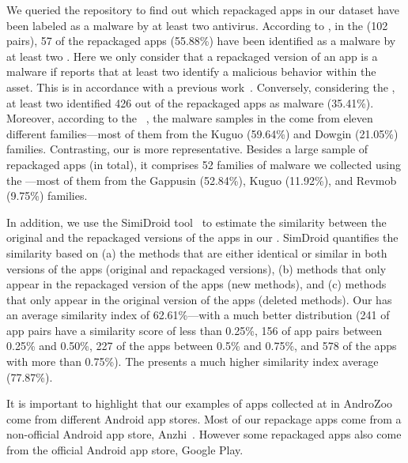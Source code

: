 We queried the \vt repository to find out which repackaged apps in our
dataset have been labeled as a malware by at least two antivirus. According to \vt, in the \sds (102 pairs),
57 of the repackaged apps (55.88\%) have been identified as a malware by at least two
\ses. Here we only consider that a repackaged version of an app is a malware if \vt reports that at least
two \ses identify a malicious behavior within the asset. This is in accordance with a previous work~\cite{vt-label}. Conversely, considering the \cds, at least two \se identified 426 out of the \apps repackaged apps as malware (35.41\%).
Moreover, according to the
\avt~\cite{avclass2-paper}, the malware samples in the \sds come from eleven different families---most of them from the Kuguo (59.64\%) and Dowgin (21.05\%) families.
Contrasting, our \cds is more representative. Besides a large sample of repackaged apps (\apps in total), it
comprises 52 families of malware we collected using the \avt ---most
of them from the Gappusin (52.84\%), Kuguo (11.92\%), and Revmob (9.75\%) families.

In addition, we use the SimiDroid tool~\cite{DBLP:conf/trustcom/0029BK17} to
estimate the similarity between the original and the repackaged versions of the
apps in our \cds. SimDroid quantifies the similarity
based on (a) the methods that are either identical or similar in both versions of the apps (original and repackaged versions),
(b) methods that only appear in the repackaged version of the apps (new methods), and (c) methods that only appear in the
original version of the apps (deleted methods).
Our \cds has an average similarity index of 62.61\%---with a much better distribution (241 of
app pairs have a similarity score of less than 0.25\%, 156 of app pairs
between 0.25\% and 0.50\%, 227 of the apps between 0.5\% and 0.75\%,
and 578 of the apps with more than 0.75\%). The \sds presents a much higher
similarity index average (77.87\%). 

It is important to highlight that our examples of apps collected at in AndroZoo come from different Android app stores. Most of our repackage apps come from a non-official Android app store, Anzhi~\cite{anzhi}. However some repackaged apps also come from the official Android app store, Google Play.




